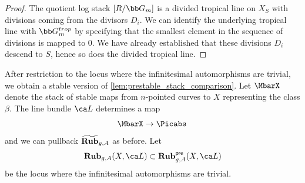 \begin{proof}

The quotient log stack $[R/\bb G_m]$ is a divided tropical line on $X_S$ with divisions coming from the divisors $D_i$. We can identify the underlying tropical line with $\bb G_m^{trop}$ by specifying that the smallest element in the sequence of divisions is mapped to $0$. We have already established that these divisions $D_i$ descend to $S$, hence so does the divided tropical line.
\end{proof}





After restriction to the locus
where the infinitesimal automorphisms are trivial, we obtain
 a stable version of \cref{lem:prestable_stack_comparison}.
Let $\MbarX$ denote the stack of stable maps from $n$-pointed curves to $X$
representing  the class $\beta$.
The line bundle $\ca L$ determines
a map $$\MbarX \to \Picabs\, $$
and we can pullback $\widetilde{\mathbf{Rub}}_{g,A}$ as before.
Let $$\cat{Rub}_{g,A}(X, \ca L) \subset \cat{Rub}_{g,A}^{\pre}(X, \ca L)$$
be the locus where the infinitesimal automorphisms are trivial.


